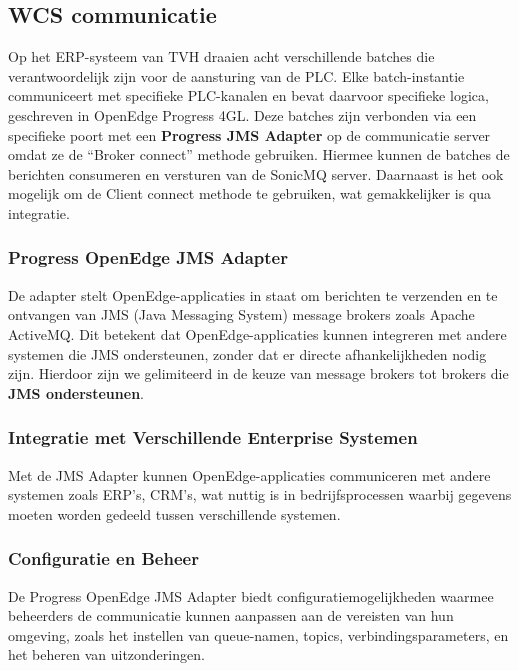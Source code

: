 \subsection{WCS communicatie} 
Op het ERP-systeem van TVH draaien acht verschillende batches die verantwoordelijk zijn voor de aansturing van de PLC. 
Elke batch-instantie communiceert met specifieke PLC-kanalen en bevat daarvoor specifieke logica, geschreven in OpenEdge Progress 4GL.
Deze batches zijn verbonden via een specifieke poort met een \textbf{Progress JMS Adapter} op de communicatie server omdat ze de ``Broker connect'' methode gebruiken.
Hiermee kunnen de batches de berichten consumeren en versturen van de SonicMQ server.
Daarnaast is het ook mogelijk om de Client connect methode te gebruiken, wat gemakkelijker is qua integratie.

\subsubsection{Progress OpenEdge JMS Adapter}
De adapter stelt OpenEdge-applicaties in staat om berichten te verzenden en te ontvangen van JMS (Java Messaging System)
message brokers zoals Apache ActiveMQ. 
Dit betekent dat OpenEdge-applicaties kunnen integreren met andere systemen die JMS ondersteunen, 
zonder dat er directe afhankelijkheden nodig zijn.
Hierdoor zijn we gelimiteerd in de keuze van message brokers tot brokers die \textbf{JMS ondersteunen}.

\subsubsection{Integratie met Verschillende Enterprise Systemen}
Met de JMS Adapter kunnen OpenEdge-applicaties communiceren met andere systemen zoals ERP's, CRM’s, 
wat nuttig is in bedrijfsprocessen waarbij gegevens moeten worden gedeeld tussen verschillende systemen.

\subsubsection{Configuratie en Beheer}
De Progress OpenEdge JMS Adapter biedt configuratiemogelijkheden waarmee beheerders de communicatie kunnen aanpassen 
aan de vereisten van hun omgeving, zoals het instellen van queue-namen, topics, verbindingsparameters, en het beheren van uitzonderingen.


